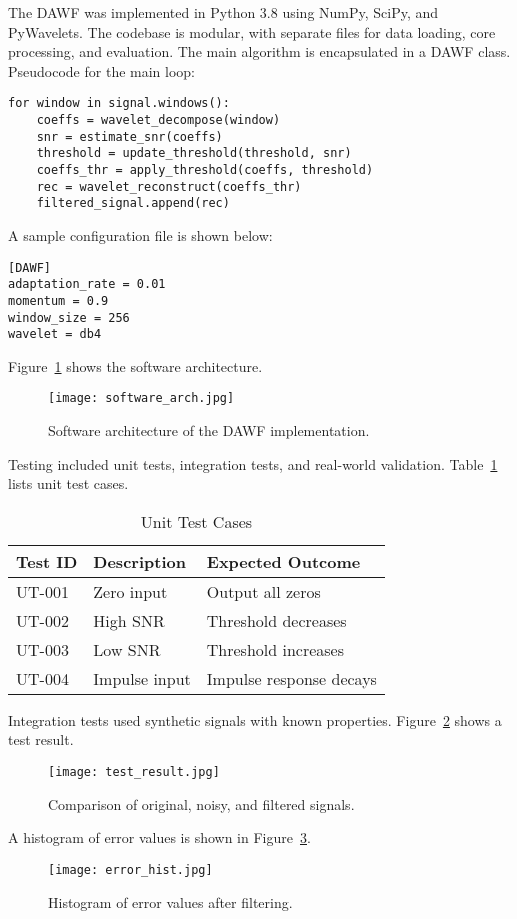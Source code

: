 \documentclass{article}
\begin{document}
The DAWF was implemented in Python 3.8 using NumPy, SciPy, and PyWavelets. The codebase is modular, with separate files for data loading, core processing, and evaluation. The main algorithm is encapsulated in a DAWF class. Pseudocode for the main loop:
\begin{verbatim}
for window in signal.windows():
    coeffs = wavelet_decompose(window)
    snr = estimate_snr(coeffs)
    threshold = update_threshold(threshold, snr)
    coeffs_thr = apply_threshold(coeffs, threshold)
    rec = wavelet_reconstruct(coeffs_thr)
    filtered_signal.append(rec)
\end{verbatim}
A sample configuration file is shown below:
\begin{verbatim}
[DAWF]
adaptation_rate = 0.01
momentum = 0.9
window_size = 256
wavelet = db4
\end{verbatim}
Figure~\ref{fig:impl_fig} shows the software architecture.
\begin{figure}[h!]
\centering
\texttt{[image: software\_arch.jpg]}
\caption{Software architecture of the DAWF implementation.}
\label{fig:impl_fig}
\end{figure}

Testing included unit tests, integration tests, and real-world validation. Table~\ref{tab:unit_tests} lists unit test cases.
\begin{table}[h!]
\centering
\caption{Unit Test Cases}
\begin{tabular}{|l|l|l|}
\hline
Test ID & Description & Expected Outcome \\
\hline
UT-001 & Zero input & Output all zeros \\
UT-002 & High SNR & Threshold decreases \\
UT-003 & Low SNR & Threshold increases \\
UT-004 & Impulse input & Impulse response decays \\
\hline
\end{tabular}
\label{tab:unit_tests}
\end{table}
Integration tests used synthetic signals with known properties. Figure~\ref{fig:test_results} shows a test result.
\begin{figure}[h!]
\centering
\texttt{[image: test\_result.jpg]}
\caption{Comparison of original, noisy, and filtered signals.}
\label{fig:test_results}
\end{figure}
A histogram of error values is shown in Figure~\ref{fig:error_hist}.
\begin{figure}[h!]
\centering
\texttt{[image: error\_hist.jpg]}
\caption{Histogram of error values after filtering.}
\label{fig:error_hist}
\end{figure}
\end{document}
